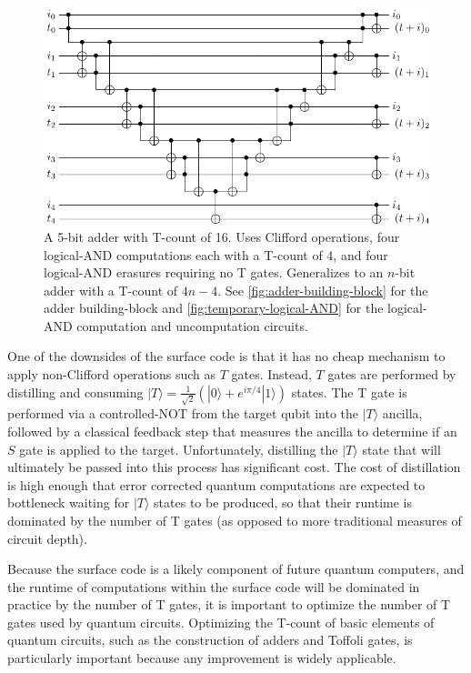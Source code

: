 \documentclass[twocolumn]{quantumarticle-customized}
\begin{document}
\begin{figure}
  \includegraphics[width=\linewidth]{adder.pdf}
  \caption{
	A 5-bit adder with T-count of 16.
	Uses Clifford operations, four logical-AND computations each with a T-count of 4, and four logical-AND erasures requiring no T gates.
	Generalizes to an $n$-bit adder with a T-count of $4n - 4$.
	See \autoref{fig:adder-building-block} for the adder building-block and \autoref{fig:temporary-logical-AND} for the logical-AND computation and uncomputation circuits.
  }
  \label{fig:adder}
\end{figure}

One of the downsides of the surface code is that it has no cheap mechanism to apply non-Clifford operations such as $T$ gates.
Instead, $T$ gates are performed by distilling and consuming $|T\rangle = \frac{1}{\sqrt{2}} (|0\rangle + e^{i \pi/4} |1\rangle)$ states.
The T gate is performed via a controlled-NOT from the target qubit into the $|T\rangle$ ancilla, followed by a classical feedback step that measures the ancilla to determine if an $S$ gate is applied to the target.
Unfortunately, distilling the $|T\rangle$ state that will ultimately be passed into this process has significant cost.
The cost of distillation is high enough that error corrected quantum computations are expected to bottleneck waiting for $|T\rangle$ states to be produced, so that their runtime is dominated by the number of T gates (as opposed to more traditional measures of circuit depth).

Because the surface code is a likely component of future quantum computers, and the runtime of computations within the surface code will be dominated in practice by the number of T gates, it is important to optimize the number of T gates used by quantum circuits.
Optimizing the T-count of basic elements of quantum circuits, such as the construction of adders and Toffoli gates, is particularly important because any improvement is widely applicable.
\end{document}
